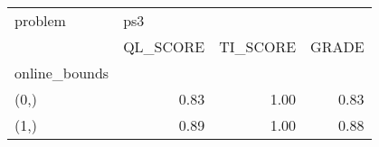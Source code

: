 \begin{tabular}{lrrr}
\toprule
problem & \multicolumn{3}{l}{ps3} \\
{} & QL\_SCORE & TI\_SCORE & GRADE \\
online\_bounds &          &          &       \\
\midrule
(0,)          &     0.83 &     1.00 &  0.83 \\
(1,)          &     0.89 &     1.00 &  0.88 \\
\bottomrule
\end{tabular}
